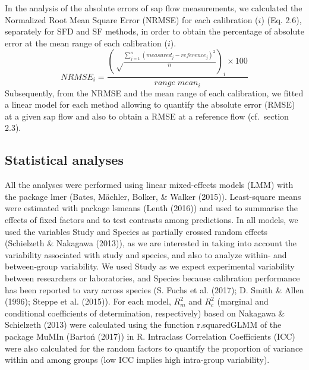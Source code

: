 \documentclass[11pt,twoside]{reedthesis}
\begin{document}
In the analysis of the absolute errors of sap flow measurements, we
calculated the Normalized Root Mean Square Error (NRMSE) for each
calibration (\(i\)) (Eq. 2.6), separately for SFD and SF methods, in
order to obtain the percentage of absolute error at the mean range of
each calibration (\(i\)).
\begin{equation}
NRMSE_i = \frac{(\sqrt \frac{\sum_{j=1}^{n} (measured_j-reference_j)^2}{n})_i\times 100}{range\;mean_i}
\end{equation}
Subsequently, from the NRMSE and the mean range of each calibration, we
fitted a linear model for each method allowing to quantify the absolute
error (RMSE) at a given sap flow and also to obtain a RMSE at a
reference flow (cf.~section 2.3).\par

\subsection{Statistical analyses}\label{statistical-analyses}

All the analyses were performed using linear mixed-effects models (LMM)
with the package lmer (Bates, Mächler, Bolker, \& Walker (2015)).
Least-square means were estimated with package lsmeans (Lenth (2016))
and used to summarise the effects of fixed factors and to test contrasts
among predictions. In all models, we used the variables Study and
Species as partially crossed random effects (Schielzeth \& Nakagawa
(2013)), as we are interested in taking into account the variability
associated with study and species, and also to analyze within- and
between-group variability. We used Study as we expect experimental
variability between researchers or laboratories, and Species because
calibration performance has been reported to vary across species (S.
Fuchs et al. (2017); D. Smith \& Allen (1996); Steppe et al. (2015)).
For each model, \(R^2_m\) and \(R^2_c\) (marginal and conditional
coefficients of determination, respectively) based on Nakagawa \&
Schielzeth (2013) were calculated using the function r.squaredGLMM of
the package MuMIn (Bartoń (2017)) in R. Intraclass Correlation
Coefficients (ICC) were also calculated for the random factors to
quantify the proportion of variance within and among groups (low ICC
implies high intra-group variability).\par
\end{document}
